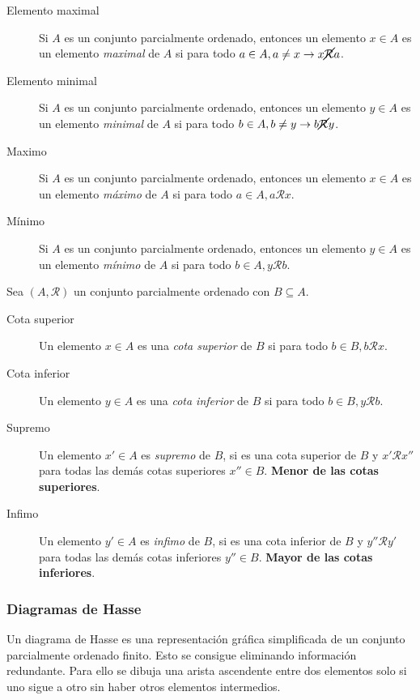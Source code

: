 \documentclass[a4paper, twoside]{article}
\begin{document}
\begin{description}
	\item[Elemento maximal] Si $A$ es un conjunto parcialmente ordenado, entonces un elemento $x \in A$ es un elemento \emph{maximal} de $A$ si para todo $a \in A, a \neq x \rightarrow x \cancel{\mathcal{R}} a$.
	\item[Elemento minimal] Si $A$ es un conjunto parcialmente ordenado, entonces un elemento $y \in A$ es un elemento \emph{minimal} de $A$ si para todo $b \in A, b \neq y \rightarrow b \cancel{\mathcal{R}} y$.
	\item[Maximo] Si $A$ es un conjunto parcialmente ordenado, entonces un elemento $x \in A$ es un elemento \emph{máximo} de $A$ si para todo $a \in A,a \mathcal{R} x$.
	\item[Mínimo] Si $A$ es un conjunto parcialmente ordenado, entonces un elemento $y \in A$ es un elemento \emph{mínimo} de $A$ si para todo $b \in A,y \mathcal{R} b$.
\end{description}

Sea $(A,\mathcal{R})$ un conjunto parcialmente ordenado con $B \subseteq A$.

\begin{description}
	\item[Cota superior] Un elemento $x \in A$ es una \emph{cota superior} de $B$ si para todo $b \in B,b \mathcal{R} x$.
	\item[Cota inferior] Un elemento $y \in A$ es una \emph{cota inferior} de $B$ si para todo $b \in B,y \mathcal{R} b$.
	\item[Supremo] Un elemento $x' \in A$ es \emph{supremo} de $B$, si es una cota superior de $B$ y $x'\mathcal{R}x''$ para todas las demás cotas superiores $x'' \in B$. \textbf{Menor de las cotas superiores}.
	\item[Infimo] Un elemento $y' \in A$ es \emph{infimo} de $B$, si es una cota inferior de $B$ y $y''\mathcal{R}y'$ para todas las demás cotas inferiores $y'' \in B$. \textbf{Mayor de las cotas inferiores}.
\end{description}

\subsubsection{Diagramas de Hasse}
Un diagrama de Hasse es una representación gráfica simplificada de un conjunto parcialmente ordenado finito.
Esto se consigue eliminando información redundante. Para ello se dibuja una arista ascendente entre dos elementos solo si uno sigue a otro sin haber otros elementos intermedios.\\
\end{document}
